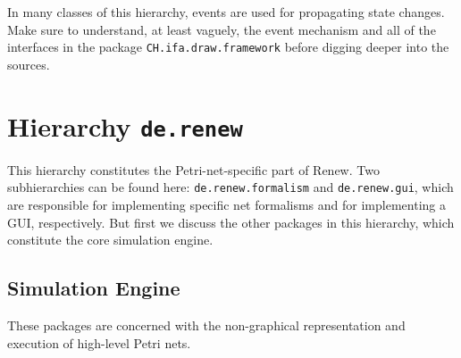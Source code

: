 In many classes of this hierarchy, events are used for
propagating state changes. Make sure to understand, at least vaguely,
the event mechanism and all of the interfaces in the package
\texttt{CH.ifa.draw.framework}
before digging deeper into the sources.

\section{Hierarchy \texttt{de.renew}}

This hierarchy constitutes the Petri-net-specific part of Renew.
Two subhierarchies can be found here: \texttt{de.renew.formalism}
and \texttt{de.renew.gui}, which are responsible for implementing
specific net formalisms and for implementing a GUI, respectively.
But first we discuss the other packages in this hierarchy,
which constitute the core simulation engine.

\subsection{Simulation Engine}

These packages are concerned with the non-graphical representation
and execution of high-level Petri nets.

